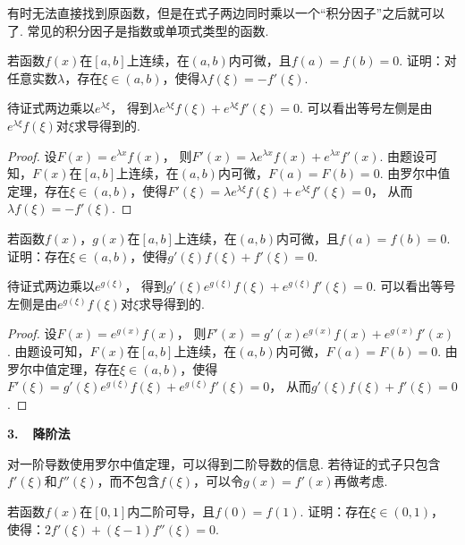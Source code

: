 有时无法直接找到原函数，但是在式子两边同时乘以一个“积分因子”之后就可以了.
常见的积分因子是指数或单项式类型的函数.

\begin{example}
\label{ex:ch04-26}
若函数$f(x)$在$[a,b]$上连续，在$(a,b)$内可微，且$f(a)=f(b)=0$.
证明：对任意实数$\lambda$，存在$\xi \in (a,b)$，使得$\lambda f(\xi) =- f'(\xi)$.
\end{example}

\begin{analysis}
待证式两边乘以$e^{\lambda \xi}$，
得到$\lambda e^{\lambda \xi} f(\xi) + e^{\lambda \xi} f'(\xi)=0$.
可以看出等号左侧是由$e^{\lambda \xi}f(\xi)$对$\xi$求导得到的.
\end{analysis}

\begin{proof}
设$F(x) = e^{\lambda x}f(x)$，
则$F'(x) = \lambda e^{\lambda x} f(x) + e^{\lambda x} f'(x)$.
由题设可知，$F(x)$在$[a,b]$上连续，在$(a,b)$内可微，$F(a) = F(b) = 0$.
由罗尔中值定理，存在$\xi \in (a,b)$，使得$F'(\xi) = \lambda e^{\lambda \xi} f(\xi) + e^{\lambda \xi} f'(\xi) =0$，
从而$\lambda f(\xi) =- f'(\xi)$.
\end{proof}

\begin{example}
\label{ex:ch04-27}
若函数$f(x)$，$g(x)$在$[a,b]$上连续，在$(a,b)$内可微，且$f(a)=f(b)=0$.
证明：存在$\xi \in (a,b)$，使得$g'(\xi)f(\xi)+f'(\xi)=0$.
\end{example}

\begin{analysis}
待证式两边乘以$e^{g(\xi)}$，
得到$g'(\xi) e^{g(\xi)} f(\xi) + e^{g(\xi)} f'(\xi)=0$.
可以看出等号左侧是由$e^{g(\xi)}f(\xi)$对$\xi$求导得到的.
\end{analysis}

\begin{proof}
设$F(x) = e^{g(x)}f(x)$，
则$F'(x) = g'(x) e^{g(x)} f(x) + e^{g(x)} f'(x)$.
由题设可知，$F(x)$在$[a,b]$上连续，在$(a,b)$内可微，$F(a) = F(b) = 0$.
由罗尔中值定理，存在$\xi \in (a,b)$，使得$F'(\xi) = g'(\xi) e^{g(\xi)} f(\xi) + e^{g(\xi)} f'(\xi) =0$，
从而$g'(\xi) f(\xi) + f'(\xi)=0$.
\end{proof}

\textbf{3.~~降阶法} \vspace{0.25em}

对一阶导数使用罗尔中值定理，可以得到二阶导数的信息.
若待证的式子只包含$f'(\xi)$和$f''(\xi)$，而不包含$f(\xi)$，可以令$g(x) = f'(x)$再做考虑.

\begin{example}
\label{ex:ch04-28}
若函数$f(x)$在$[0,1]$内二阶可导，且$f(0)=f(1)$.
证明：存在$\xi \in (0,1)$，
使得：$2f'(\xi) +(\xi - 1)f''(\xi) = 0$.
\end{example}

